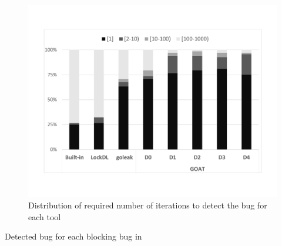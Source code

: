 \begin{figure}
\centering
  \includegraphics[width=.95\linewidth]{figs/P4_runs.pdf}
  \caption{Distribution of required number of iterations to detect the bug for each tool}
  \label{fig:runs}
\end{figure}


\begin{table}[]
\caption{Detected bug for each blocking bug in }
\centering
\scalebox{0.8}{
    
  }
\label{tab:comarison}
\end{table}
